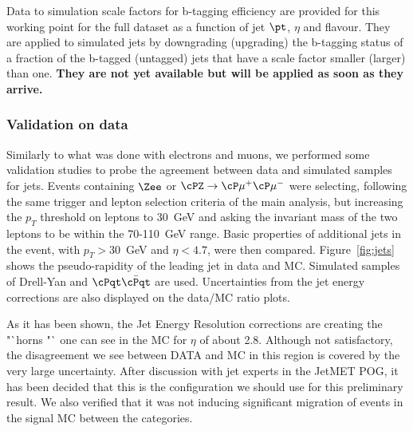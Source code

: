 Data to simulation scale factors for b-tagging efficiency are provided for this working point for the full dataset as a function of jet $\pt$, $\eta$ and flavour.
They are applied to simulated jets by downgrading (upgrading) the b-tagging status of a fraction of the b-tagged (untagged) jets that have a scale factor smaller (larger) than one. \textbf{They are not yet available but will be applied as soon as they arrive.}


\subsubsection{Validation on data}
Similarly to what was done with electrons and muons, we performed some validation studies to probe the agreement between data and simulated samples for jets. 
Events containing $\Zee$ or $\cPZ\rightarrow\cP\mu^{+}\cP\mu^{-}$ were selecting, following the same trigger and lepton selection criteria of the main analysis, but increasing the $p_T$ threshold on leptons  to 30~GeV and asking the invariant mass of the two leptons to be within the 70-110~GeV range.
Basic properties of additional jets in the event,  with $p_T>30$~GeV and $\eta<4.7$, were then compared. 
Figure~\ref{fig:jets} shows the pseudo-rapidity of the leading jet in data and MC. Simulated samples of Drell-Yan and $\ensuremath{\cPqt\bar{\cPqt}}$ are used. Uncertainties from the jet energy corrections are also displayed on the data/MC ratio plots.

As it has been shown, the Jet Energy Resolution corrections are creating the "`horns "` one can see in the MC for $\eta$ of about 2.8. Although not satisfactory, the disagreement we see between DATA and MC in this region is covered by the very large uncertainty. After discussion with jet experts in the JetMET POG, it has been decided that this is the configuration we should use for this preliminary result. We also verified that it was not inducing significant migration of events in the signal MC between the categories.

